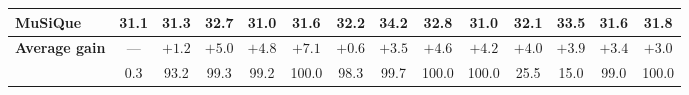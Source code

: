 \begin{table}[t]
\begin{center}
{\begin{tabular}{lccccccccccccc}
MuSiQue      & 31.1 & \cellcolor{green!6}31.3 & \cellcolor{green!10}32.7 & \cellcolor{red!6}31.0 & \cellcolor{green!7}31.6 & \cellcolor{green!9}32.2 & \cellcolor{green!15}\textbf{34.2} & \cellcolor{green!11}32.8 & \cellcolor{red!6}31.0 & \cellcolor{green!9}32.1 & \cellcolor{green!13}33.5 & \cellcolor{green!8}31.6 & \cellcolor{green!8}31.8 \\
\midrule
\textbf{Average gain} & --- & \cellcolor{green!9}$+1.2$ & \cellcolor{green!20}$+5.0$ & \cellcolor{green!20}$+4.8$ & \cellcolor{green!27}$+7.1$ & \cellcolor{green!7}$+0.6$ & \cellcolor{green!16}$+3.5$ & \cellcolor{green!19}$+4.6$ & \cellcolor{green!18}$+4.2$ & \cellcolor{green!18}$+4.0$ & \cellcolor{green!18}$+3.9$ & \cellcolor{green!16}$+3.4$ & \cellcolor{green!15}$+3.0$ \\
\midrule\midrule
\branchproof{} & 0.3 & 93.2 & 99.3 & 99.2 & 100.0 & 98.3 & 99.7 & 100.0 & 100.0 & 25.5 & 15.0 & 99.0 & 100.0 \\
\bottomrule
\end{tabular}}
\end{center}
\end{table}
